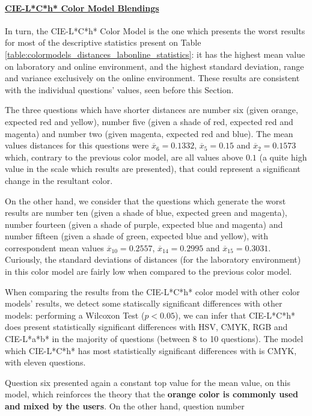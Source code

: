 \paragraph{\ul{CIE-L*C*h* Color Model Blendings}} \par
\label{par:lchcolormodel}
%
In turn, the CIE-L*C*h* Color Model is the one which presents the worst results for most of the descriptive statistics present on Table \ref{table:colormodels_distances_labonline_statistics}: it has the highest
mean value on laboratory and online environment, and the highest standard deviation, range and variance exclusively on the online environment. These results are consistent with the individual questions' values, seen before this
Section. \par
%
The three questions which have shorter distances are number six (given orange, expected red and yellow), number five (given a shade of red, expected red and magenta) and number two (given magenta, expected red
and blue). The mean values distances for this questions were $\overline{x}_{6} = 0.1332$, $\overline{x}_{5} = 0.15$ and $\overline{x}_{2} = 0.1573$ which, contrary to the previous color model, are all values above $0.1$ (a quite
high value in the scale which results are presented), that could represent a significant change in the resultant color. \par
%
On the other hand, we consider that the questions which generate the worst results are number ten (given a shade of blue, expected green and magenta), number fourteen (given a shade of purple, expected blue and magenta) and number
fifteen (given a shade of green, expected blue and yellow), with correspondent mean values $\overline{x}_{10} = 0.2557$, $\overline{x}_{14} = 0.2995$ and $\overline{x}_{15} = 0.3031$. Curiously, the standard deviations of distances (for the
laboratory environment) in this color model are fairly low when compared to the previous color model. \par
%
When comparing the results from the CIE-L*C*h* color model with other color models' results, we detect some statiscally significant differences with other models: performing a Wilcoxon Test ($p < 0.05$), we can infer that CIE-L*C*h* does
present statistically significant differences with HSV, CMYK, RGB and CIE-L*a*b* in the majority of questions (between 8 to 10 questions). The model which CIE-L*C*h* has most statistically significant differences with is CMYK, with eleven questions. \par
%
Question six presented again a constant top value for the mean value, on this model, which reinforces the theory that the \textbf{orange color is commonly used and mixed by the users}. On the other hand, question number
